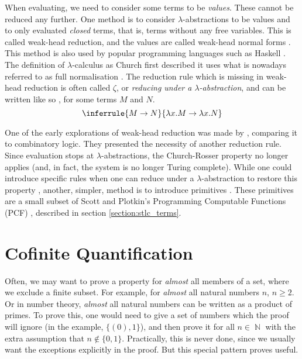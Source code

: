 \documentclass[logo,bsc,singlespacing,parskip,online]{infthesis}
\DeclareMathOperator{\nat}{\mathbb{N}}
\begin{document}
When evaluating, we need to consider some terms to be \textit{values}. These cannot be reduced any
further. One method is to consider $\lambda$-abstractions to be values and to only evaluated
\textit{closed} terms, that is, terms without any free variables. This is called weak-head
reduction, and the values are called weak-head normal forms \citep{wadler_programming_2022}. This
method is also used by popular programming languages such as Haskell \citep{hutchison_sharing_2005}.
The definition of $\lambda$-calculus as Church first described it uses what is nowadays referred to
as full normalisation \citep{wadler_programming_2022}. The reduction rule which is missing in
weak-head reduction is often called $\zeta$, or \textit{reducing under a $\lambda$-abstraction}, and
can be written like so \citep{hutchison_sharing_2005}, for some terms $M$ and $N$.
\begin{equation*}
\inferrule
  {M \to N}
  {\lambda x. M \to \lambda x. N}
\end{equation*}

One of the early explorations of weak-head reduction was made by \citet{cagman_combinatory_1998},
comparing it to combinatory logic. They presented the necessity of another reduction rule. Since
evaluation stops at $\lambda$-abstractions, the Church-Rosser property no longer applies (and, in
fact, the system is no longer Turing complete). While one could introduce specific rules when one
can reduce under a $\lambda$-abstraction to restore this property \citep{hutchison_sharing_2005},
another, simpler, method is to introduce primitives \citep{wadler_programming_2022}. These
primitives are a small subset of Scott and Plotkin's Programming Computable Functions (PCF)
\citep{plotkin_lcf_1977}, described in section \ref{section:stlc_terms}.

\section{Cofinite Quantification}

Often, we may want to prove a property for \textit{almost} all members of a set, where we exclude a
finite subset. For example, for \textit{almost} all natural numbers $n$, $n \geq 2$. Or in number
theory, \textit{almost} all natural numbers can be written as a product of primes. To prove this,
one would need to give a set of numbers which the proof will ignore (in the example, $\{ (0), 1
\}$), and then prove it for all $n \in \nat$ with the extra assumption that $n \not \in \{0, 1\}$.
Practically, this is never done, since we usually want the exceptions explicitly in the proof. But
this special pattern proves useful.
\end{document}

